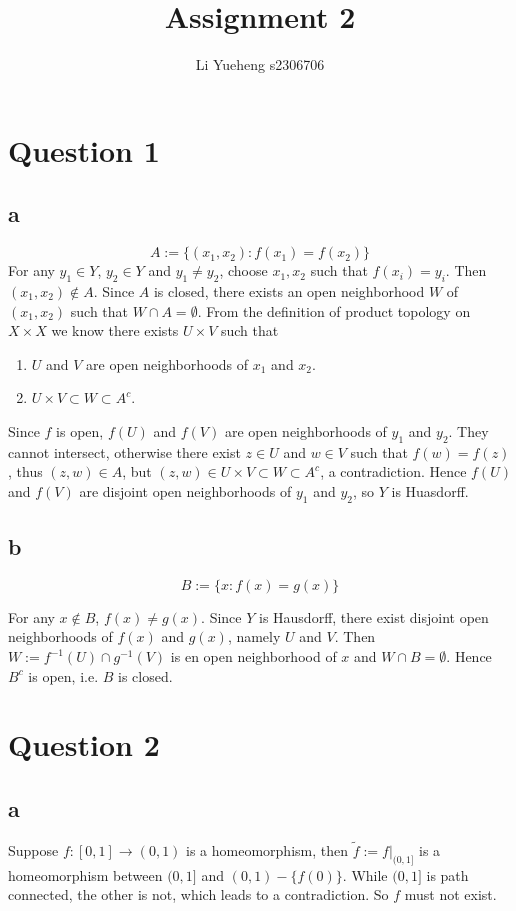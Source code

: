 \documentclass{article}
\begin{document}
\title{Assignment 2}
\author{Li Yueheng s2306706}

\maketitle


\section*{Question 1}
\subsection*{a}
$$A:=\{(x_1,x_2):f(x_1)=f(x_2)\} $$
For any $y_1\in Y$, $y_2\in Y$ and $y_1\neq y_2$, choose $x_1,x_2$ such that $f(x_i)=y_i$. Then $(x_1,x_2)\notin A$. Since $A$ is closed, there exists  an open neighborhood $W$ of $(x_1,x_2)$ such that $W\cap A=\emptyset$. From the definition of product topology on $X\times X$ we know there exists $U\times V$ such that 
\begin{enumerate}
	\item $U$ and $V$ are open neighborhoods of $x_1$ and $x_2$.
	\item $U\times V \subset W \subset A^c$.
\end{enumerate}
Since $f$ is open, $f(U)$ and $f(V)$ are open neighborhoods of $y_1$ and $y_2$. They cannot intersect, otherwise there exist $z\in U$ and $w\in V$ such that $f(w)=f(z)$, thus $(z,w)\in A$, but $(z,w)\in U\times V\subset W \subset A^c$, a contradiction. Hence $f(U)$ and $f(V)$ are disjoint open neighborhoods of $y_1$ and $y_2$, so $Y$ is Huasdorff.


\subsection*{b}
$$B:=\{x:f(x)=g(x)\}$$

For any $x\notin B$, $f(x)\neq g(x)$. Since $Y$ is Hausdorff, there exist disjoint open neighborhoods of $f(x)$ and $g(x)$, namely $U$ and $V$. Then $W:=f^{-1}(U)\cap g^{-1}(V)$ is en open neighborhood of $x$ and $W\cap B=\emptyset$. Hence $B^c$ is open, i.e. $B$ is closed. 





\section*{Question 2}
\subsection*{a}
Suppose $f:[0,1]\to (0,1)$ is a homeomorphism, then $\tilde{f}:=f|_{(0,1]}$ is a homeomorphism between $(0,1]$ and $(0,1)-\{f(0) \}$. While $ (0,1]$ is path connected, the other is not, which leads to a contradiction. So $f$ must not exist.
\end{document}
